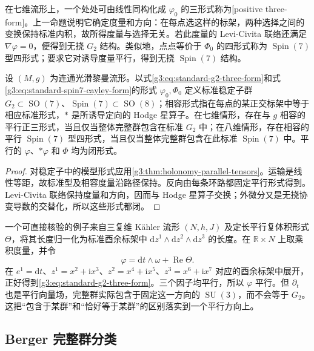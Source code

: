 \ProseParagraphBreak

在七维流形上，一个处处可由线性同构化成 \(\varphi_0\) 的三形式称为[positive three-form]。上一命题说明它确定度量和方向：在每点选这样的标架，两种选择之间的变换保持标准内积，故所得度量与选择无关。若此度量的 Levi-Civita 联络还满足 \(\nabla\varphi=0\)，便得到无挠 \(G_2\) 结构。类似地，点点等价于 \(\Phi_0\) 的四形式称为 \(\operatorname{Spin}(7)\) 型四形式；要求它对诱导度量平行，得到无挠 \(\operatorname{Spin}(7)\) 结构。

\begin{proposition}\label{g3:prop:exceptional-parallel-forms}
	设 \((M,g)\) 为连通光滑黎曼流形。以式\eqref{g3:eq:standard-g2-three-form}和式\eqref{g3:eq:standard-spin7-cayley-form}的形式 \(\varphi_0,\Phi_0\) 定义标准稳定子群 \(G_2\subset\operatorname{SO}(7)\)、\(\operatorname{Spin}(7)\subset\operatorname{SO}(8)\)；相容形式指在每点的某正交标架中等于相应标准形式，\(*\) 是所诱导定向的 Hodge 星算子。在七维情形，存在与 \(g\) 相容的平行正三形式，当且仅当整体完整群包含在标准 \(G_2\) 中；在八维情形，存在相容的平行 \(\operatorname{Spin}(7)\) 型四形式，当且仅当整体完整群包含在此标准 \(\operatorname{Spin}(7)\) 中。平行的 \(\varphi\)、\(*\varphi\) 和 \(\Phi\) 均为闭形式。
\end{proposition}
\begin{proof}
	对稳定子中的模型形式应用\cref{g3:thm:holonomy-parallel-tensors}。运输是线性等距，故标准型及相容度量沿路径保持。反向由每条环路都固定平行形式得到。Levi-Civita 联络保持度量和方向，因而与 Hodge 星算子交换；外微分又是无挠协变导数的交替化，所以这些形式都闭。
\end{proof}

一个可直接核验的例子来自三复维 Kähler 流形 \((N,h,J)\) 及定长平行复体积形式 \(\Theta\)，将其长度归一化为标准酉余标架中 \(\mathrm dz^1\wedge\mathrm dz^2\wedge\mathrm dz^3\) 的长度。在 \(\mathbb R\times N\) 上取乘积度量，并令
\[
	\varphi=\mathrm dt\wedge\omega+\operatorname{Re}\Theta.
\]
在 \(e^1=\mathrm dt\)、\(z^1=x^2+\mathrm ix^3\)、\(z^2=x^4+\mathrm ix^5\)、\(z^3=x^6+\mathrm ix^7\) 对应的酉余标架中展开，正好得到\eqref{g3:eq:standard-g2-three-form}。三个因子均平行，所以 \(\varphi\) 平行。但 \(\partial_t\) 也是平行向量场，完整群实际包含于固定这一方向的 \(\operatorname{SU}(3)\)，而不会等于 \(G_2\)。这把“包含于某群”和“恰好等于某群”的区别落实到一个平行方向上。

\subsection{Berger 完整群分类}
\label{g3:subsec:0505:03}

